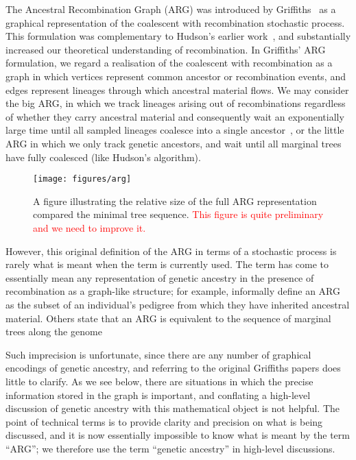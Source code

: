 \documentclass{article}
\newcommand{\jkcomment}[1]{\textcolor{red}{#1}}
\begin{document}
The Ancestral Recombination Graph (ARG) was introduced by
Griffiths~\citep{griffiths1991two,griffiths1997ancestral} as a graphical
representation of the coalescent with recombination stochastic process. This
formulation was complementary to Hudson's earlier
work~\citep{hudson1983properties}, and substantially increased our theoretical
understanding of recombination. In Griffiths' ARG formulation, we
regard a realisation of the coalescent with recombination as a graph in which
vertices represent common ancestor or recombination events, and edges represent
lineages through which ancestral material flows.
We may consider the big ARG, in which we track lineages arising out of
recombinations regardless of whether they carry ancestral material and
consequently wait an exponentially large time until all sampled lineages
coalesce into a single ancestor~\citep{ethier1990two}, or the little ARG in
which we only track genetic ancestors, and wait until all marginal trees
have fully coalesced (like Hudson's algorithm).

\begin{figure}
\begin{center}
\texttt{[image: figures/arg]}
\end{center}
\caption{\label{fig-arg} A figure illustrating the relative size of
the full ARG representation compared the minimal tree sequence.
\jkcomment{This figure is quite preliminary and we need to improve it.}}
\end{figure}

However, this original definition of the ARG in terms of a stochastic process
is rarely what is meant when the term is currently used. The term has come to
essentially mean any representation of genetic ancestry in the presence
of recombination as a graph-like structure; for example,
\cite{mathieson2020ancestry} informally define an ARG as the subset of an
individual's pedigree from which they have inherited ancestral material.
Others state that an ARG is equivalent to the sequence of marginal
trees along the genome~\citep{mirzaei2016rent}

Such
imprecision is unfortunate, since there are any number of graphical encodings of
genetic ancestry, and referring to the original Griffiths papers does little to
clarify. As we see below, there are situations in which the precise information
stored in the graph is important, and conflating a high-level
discussion of genetic ancestry with this mathematical object is not
helpful. The point of technical terms is to provide clarity and
precision on what is being discussed, and it is now essentially
impossible to know what is meant by the term ``ARG'';
we therefore use the term ``genetic ancestry'' in high-level
discussions.
\end{document}
